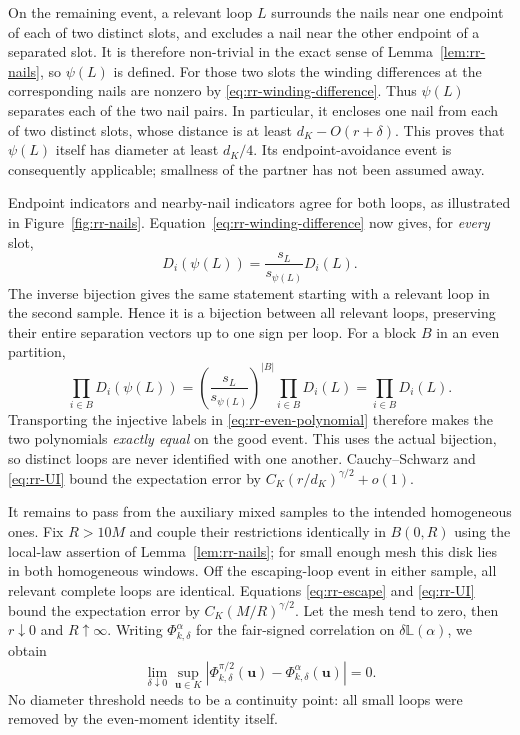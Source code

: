 On the remaining event, a relevant loop $L$ surrounds the nails
near one endpoint of each of two distinct slots, and excludes a
nail near the other endpoint of a separated slot.  It is therefore
non-trivial in the exact sense of Lemma~\ref{lem:rr-nails}, so
$\psi(L)$ is defined.  For those two slots the winding differences
at the corresponding nails are nonzero by
\eqref{eq:rr-winding-difference}.  Thus $\psi(L)$ separates each
of the two nail pairs.  In particular, it encloses one nail from
each of two distinct slots, whose distance is at least
$d_K-O(r+\delta)$.  This proves that $\psi(L)$ itself has diameter
at least $d_K/4$.  Its endpoint-avoidance event is consequently
applicable; smallness of the partner has not been assumed away.

Endpoint indicators and nearby-nail indicators agree for both
loops, as illustrated in Figure~\ref{fig:rr-nails}.
Equation~\eqref{eq:rr-winding-difference} now gives,
for \emph{every} slot,
\begin{equation}
 D_i(\psi(L))=\frac{s_L}{s_{\psi(L)}}D_i(L).
 \label{eq:rr-signature}
\end{equation}
The inverse bijection gives the same statement starting with a
relevant loop in the second sample.  Hence it is a bijection
between all relevant loops, preserving their entire separation
vectors up to one sign per loop.  For a block $B$ in an even
partition,
\[
 \prod_{i\in B}D_i(\psi(L))
    =\left(\frac{s_L}{s_{\psi(L)}}\right)^{|B|}
                       \prod_{i\in B}D_i(L)
    =\prod_{i\in B}D_i(L).
\]
Transporting the injective labels in
\eqref{eq:rr-even-polynomial} therefore makes the two polynomials
\emph{exactly equal} on the good event.  This uses the actual
bijection, so distinct loops are never identified with one another.
Cauchy--Schwarz and \eqref{eq:rr-UI} bound the expectation error by
$C_K(r/d_K)^{\gamma/2}+o(1)$.

It remains to pass from the auxiliary mixed samples to the intended
homogeneous ones.  Fix $R>10M$ and couple their restrictions
identically in $B(0,R)$ using the local-law assertion of
Lemma~\ref{lem:rr-nails}; for small enough mesh this disk lies in
both homogeneous windows.  Off the escaping-loop event in either
sample, all relevant complete loops are identical.  Equations
\eqref{eq:rr-escape} and \eqref{eq:rr-UI} bound the expectation
error by $C_K(M/R)^{\gamma/2}$.  Let the mesh tend to zero,
then $r\downarrow0$ and $R\uparrow\infty$.  Writing
$\Phi^{\alpha}_{k,\delta}$ for the fair-signed correlation on
$\delta\mathbb L(\alpha)$, we obtain
\begin{equation}
 \lim_{\delta\downarrow0}\sup_{\boldsymbol u\in K}
 \left|\Phi^{\pi/2}_{k,\delta}(\boldsymbol u)
                   -\Phi^{\alpha}_{k,\delta}(\boldsymbol u)\right|=0.
 \label{eq:rr-isoradial-transfer}
\end{equation}
No diameter threshold needs to be a continuity point: all small
loops were removed by the even-moment identity itself.

